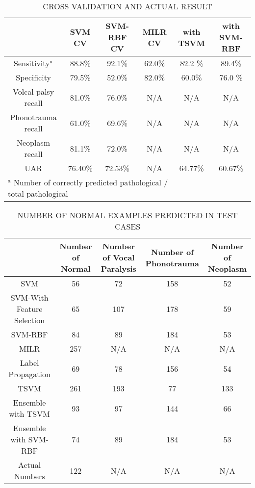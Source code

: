 \begin{table*}[!htbp]
	\caption{CROSS VALIDATION AND ACTUAL RESULT}
	\begin{center}
		\begin{tabular}{|c|c|c|c|c|c|}
			\hline
			 & SVM CV & SVM-RBF CV & MILR CV & with TSVM & with SVM-RBF \\
			\hline
			Sensitivity$^{\mathrm{a}}$  & 88.8\%& 92.1\% & 62.0\% & 82.2 \% & 89.4\% \\
			\hline
			Specificity & 79.5\% & 52.0\%& 82.0\%& 60.0\% & 76.0 \% \\
			\hline
			Volcal palsy recall & 81.0\% &76.0\%& N/A & N/A & N/A \\
			\hline
			Phonotrauma recall & 61.0\% &69.6\%& N/A& N/A& N/A\\
			\hline
			Neoplasm recall & 81.1\% & 72.0\%& N/A& N/A& N/A \\
			\hline
			UAR & 76.40\% &72.53\% & N/A& 64.77\% & 60.67\%\\
			\hline
			\multicolumn{4}{l}{$^{\mathrm{a}}$ Number of correctly predicted pathological / total pathological}
		\end{tabular}
		\label{tab:1}
	\end{center}
\end{table*}

\begin{table*}[!htbp]
	\caption{NUMBER OF NORMAL EXAMPLES PREDICTED IN TEST CASES}
	\begin{center}
		\begin{tabular}{|c|c|c|c|c|}
			\hline
			& Number of Normal & Number of Vocal Paralysis & Number of Phonotrauma & Number of Neoplasm \\
			\hline
			SVM & 56 & 72 &158&52 \\
			\hline
			SVM-With Feature Selection & 65 & 107 & 178  & 59 \\
			\hline
			SVM-RBF & 84 & 89 &184 & 53 \\
			\hline
			MILR & 257 & N/A & N/A& N/A\\
			\hline
			Label Propagation & 69 & 78&156 & 54 \\
			\hline
			TSVM & 261 &193&77&133\\
			\hline
			Ensemble with TSVM & 93&97&144&66\\
			\hline
			Ensemble with SVM-RBF & 74&89&184&53\\
			\hline
			Actual Numbers& 122&N/A&N/A&N/A \\
			\hline
		\end{tabular}
		\label{tab:2}
	\end{center}
\end{table*}


